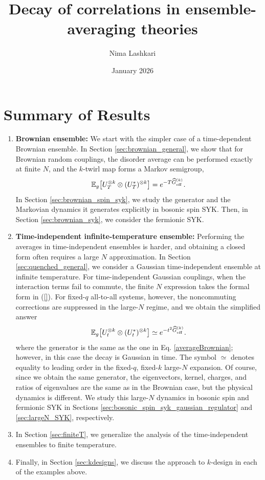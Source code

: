 \documentclass{article}
\title{Decay of correlations in ensemble-averaging theories}
\author{Nima Lashkari}
\date{January 2026}
\theoremstyle{definition}
\begin{document}
    \maketitle
    \tableofcontents

\section*{Summary of Results}

\begin{enumerate}
\item \textbf{Brownian ensemble:} We start with the simpler case of a time-dependent Brownian ensemble. 
In Section \ref{sec:brownian_general}, we show that for Brownian random couplings, the disorder average can be performed exactly
at finite $N$, and the $k$-twirl map forms a Markov semigroup,
\begin{equation}\label{averageBrownian}
    \mathbb E_g\!\left[U_T^{\otimes k}\otimes(U_T^*)^{\otimes k}\right]
    =e^{-T\widehat G_{\rm eff}^{(k)}}.
\end{equation}
In Section \ref{sec:brownian_spin_syk}, we study the generator and the Markovian dynamics it generates explicitly in bosonic spin SYK. Then, in Section \ref{sec:brownian_syk}, we consider the fermionic SYK.

\item \textbf{Time-independent infinite-temperature ensemble:} Performing the averages in time-independent ensembles is harder, and obtaining a closed form often requires a large $N$ approximation. In Section \ref{sec:quenched_general}, we consider a Gaussian time-independent ensemble at infinite temperature.
For time-independent Gaussian couplings, when the interaction terms fail to commute, the finite $N$ expression takes the formal form in (\ref{}).
For fixed-$q$ all-to-all systems, however, the noncommuting corrections are
suppressed in the large-$N$ regime, and we obtain the simplified answer
\begin{equation}
    \mathbb E_g\!\left[U_t^{\otimes k}\otimes(U_t^*)^{\otimes k}\right]
    \simeq e^{-t^2\widehat G_{\rm eff}^{(k)}}.
\end{equation}
where the generator is the same as the one in Eq. \ref{averageBrownian}; however, in this case the decay is Gaussian in time.  The symbol $\simeq$ denotes equality to
leading order in the fixed-$q$, fixed-$k$ large-$N$ expansion. Of course, since we obtain the same generator, the eigenvectors, kernel, charges, and ratios of eigenvalues are the same as in the Brownian case, but the physical dynamics is different. We study this large-$N$ dynamics in bosonic spin and fermionic SYK in Sections \ref{sec:bosonic_spin_syk_gaussian_regulator} and \ref{sec:largeN_SYK}, respectively.

\item In Section \ref{sec:finiteT}, we generalize the analysis of the time-independent ensembles to finite temperature.

\item Finally, in Section \ref{sec:kdesigns}, we discuss the approach to $k$-design in each of the examples above.
\end{enumerate}
\end{document}
